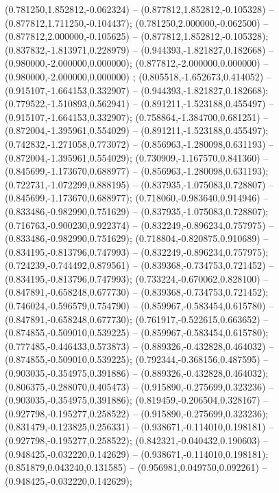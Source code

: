  (0.781250,1.852812,-0.062324) -- (0.877812,1.852812,-0.105328) -- (0.877812,1.711250,-0.104437);
 (0.781250,2.000000,-0.062500) -- (0.877812,2.000000,-0.105625) -- (0.877812,1.852812,-0.105328);
 (0.837832,-1.813971,0.228979) -- (0.944393,-1.821827,0.182668) -- (0.980000,-2.000000,0.000000);
 (0.877812,-2.000000,0.000000) -- (0.980000,-2.000000,0.000000) ;
 (0.805518,-1.652673,0.414052) -- (0.915107,-1.664153,0.332907) -- (0.944393,-1.821827,0.182668);
 (0.779522,-1.510893,0.562941) -- (0.891211,-1.523188,0.455497) -- (0.915107,-1.664153,0.332907);
 (0.758864,-1.384700,0.681251) -- (0.872004,-1.395961,0.554029) -- (0.891211,-1.523188,0.455497);
 (0.742832,-1.271058,0.773072) -- (0.856963,-1.280098,0.631193) -- (0.872004,-1.395961,0.554029);
 (0.730909,-1.167570,0.841360) -- (0.845699,-1.173670,0.688977) -- (0.856963,-1.280098,0.631193);
 (0.722731,-1.072299,0.888195) -- (0.837935,-1.075083,0.728807) -- (0.845699,-1.173670,0.688977);
 (0.718060,-0.983640,0.914946) -- (0.833486,-0.982990,0.751629) -- (0.837935,-1.075083,0.728807);
 (0.716763,-0.900230,0.922374) -- (0.832249,-0.896234,0.757975) -- (0.833486,-0.982990,0.751629);
 (0.718804,-0.820875,0.910689) -- (0.834195,-0.813796,0.747993) -- (0.832249,-0.896234,0.757975);
 (0.724239,-0.744492,0.879561) -- (0.839368,-0.734753,0.721452) -- (0.834195,-0.813796,0.747993);
 (0.733224,-0.670062,0.828100) -- (0.847891,-0.658248,0.677730) -- (0.839368,-0.734753,0.721452);
 (0.746024,-0.596579,0.754790) -- (0.859967,-0.583454,0.615780) -- (0.847891,-0.658248,0.677730);
 (0.761917,-0.522615,0.663652) -- (0.874855,-0.509010,0.539225) -- (0.859967,-0.583454,0.615780);
 (0.777485,-0.446433,0.573873) -- (0.889326,-0.432828,0.464032) -- (0.874855,-0.509010,0.539225);
 (0.792344,-0.368156,0.487595) -- (0.903035,-0.354975,0.391886) -- (0.889326,-0.432828,0.464032);
 (0.806375,-0.288070,0.405473) -- (0.915890,-0.275699,0.323236) -- (0.903035,-0.354975,0.391886);
 (0.819459,-0.206504,0.328167) -- (0.927798,-0.195277,0.258522) -- (0.915890,-0.275699,0.323236);
 (0.831479,-0.123825,0.256331) -- (0.938671,-0.114010,0.198181) -- (0.927798,-0.195277,0.258522);
 (0.842321,-0.040432,0.190603) -- (0.948425,-0.032220,0.142629) -- (0.938671,-0.114010,0.198181);
 (0.851879,0.043240,0.131585) -- (0.956981,0.049750,0.092261) -- (0.948425,-0.032220,0.142629);

